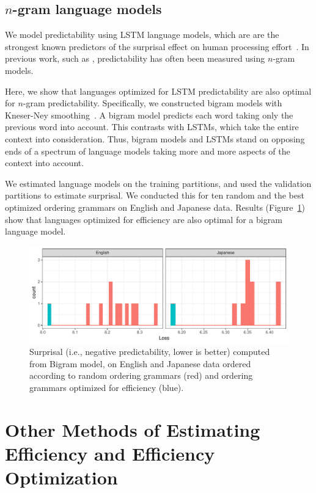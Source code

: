 \documentclass[10pt,twoside,lineno]{article}
\begin{document}
\subsection{$n$-gram language models}

We model predictability using LSTM language models, which are are the strongest known predictors of the surprisal effect on human processing effort~\citep{frank2011insensitivity,goodkind2018predictive}.
In previous work, such as \cite{gildea2015human}, predictability has often been measured using $n$-gram models.

Here, we show that languages optimized for LSTM predictability are also optimal for $n$-gram predictability.
Specifically, we constructed bigram models with Kneser-Ney smoothing~\cite{kneser1995improved, chen1999empirical}.
A bigram model predicts each word taking only the previous word into account.
This contrasts with LSTMs, which take the entire context into consideration.
Thus, bigram models and LSTMs stand on opposing ends of a spectrum of language models taking more and more aspects of the context into account.

We estimated language models on the training partitions, and used the validation partitions to estimate surprisal.
We conducted this for ten random and the best optimized ordering grammars on English and Japanese data.
Results (Figure~\ref{fig:bigrams}) show that languages optimized for efficiency are also optimal for a bigram language model.

\begin{figure}
    \centering
    \includegraphics[scale=.6]{../results/bigrams/bigrams.pdf} 
	\caption{Surprisal (i.e., negative predictability, lower is better) computed from Bigram model, on English and Japanese data ordered according to random ordering grammars (red) and ordering grammars optimized for efficiency (blue).}
    \label{fig:bigrams}
\end{figure}



\section{Other Methods of Estimating Efficiency and Efficiency Optimization}
\end{document}
